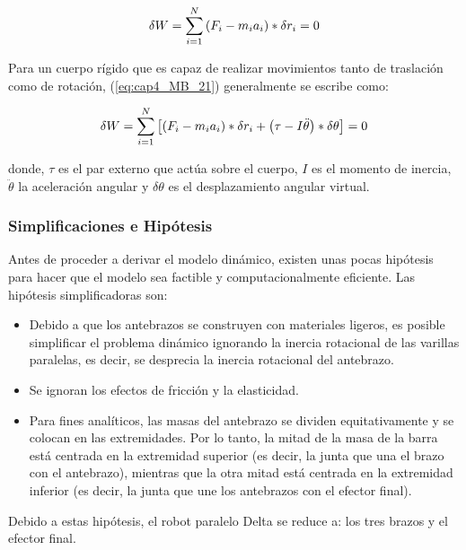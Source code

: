         \begin{equation}
          \delta W= \sum _{i=1}^{N} \left( F_{i}-m_{i}a_{i} \right) \ast \delta r_{i}=0 \\
         \label{eq:cap4_MB_21}
        \end{equation}

        
        Para un cuerpo rígido que es capaz de realizar movimientos tanto de traslación como de rotación, (\ref{eq:cap4_MB_21}) generalmente se escribe como:
        
        \begin{equation}
          \delta W= \sum _{i=1}^{N} \left[  \left( F_{i}-m_{i}a_{i} \right) \ast \delta r_{i}+ \left(  \tau-I\ddot{ \theta } \right) \ast \delta  \theta  \right] =0 \\
         \label{eq:cap4_MB_22}
        \end{equation}
        
        donde,  $\tau $  es el par externo que actúa sobre el cuerpo,  $ I $  es el momento de inercia,  $\ddot{ \theta }$   la aceleración angular y  $ \delta  \theta  $  es el desplazamiento angular virtual.
        
        \newpage


        \subsubsection{Simplificaciones e Hipótesis}
        Antes de proceder a derivar el modelo dinámico, existen unas pocas hipótesis para hacer que el modelo sea factible y computacionalmente eficiente. Las hipótesis simplificadoras son:
        
        \begin{itemize}
            \item Debido a que los antebrazos se construyen con materiales ligeros, es posible simplificar el problema dinámico ignorando la inercia rotacional de las varillas paralelas, es decir, se desprecia la inercia rotacional del antebrazo.
            \item Se ignoran los efectos de fricción y la elasticidad.
            \item Para fines analíticos, las masas del antebrazo se dividen equitativamente y se colocan en las extremidades. Por lo tanto, la mitad de la masa de la barra está centrada en la extremidad superior (es decir, la junta que una el brazo con el antebrazo), mientras que la otra mitad está centrada en la extremidad inferior (es decir, la junta que une los antebrazos con el efector final).
        \end{itemize}
        Debido a estas hipótesis, el robot paralelo Delta se reduce a: los tres brazos y el efector final.
     
